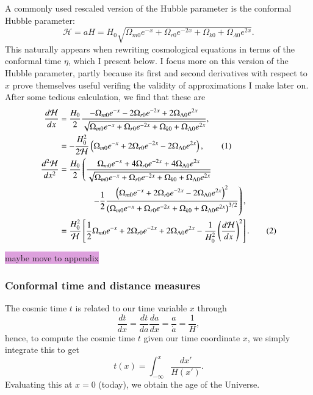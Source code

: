 \documentclass{aa}
\newcommand\numberthis{\addtocounter{equation}{1}\tag{\theequation}}
\begin{document}
A commonly used rescaled version of the Hubble parameter is the conformal Hubble parameter:
\begin{equation}
    \mathcal{H} = aH = H_0 \sqrt{\Omega_{m0} e^{-x} + \Omega_{r0} e^{-2x} + \Omega_{k0} + \Omega_{\Lambda 0}e^{2x}}. \label{eq:Hp}
\end{equation}
This naturally appears when rewriting cosmological equations in terms of the conformal time $\eta$, which I present below. I focus more on this version of the Hubble parameter, partly because its first and second derivatives with respect to $x$ prove themselves useful verifing the validity of approximations I make later on. After some tedious calculation, we find that these are
\begin{align*}
    \frac{d\mathcal{H}}{dx} &= \frac{H_0}{2}
    \frac{-\Omega_{m0}e^{-x} - 2\Omega_{r0}e^{-2x} + 2\Omega_{\Lambda0}e^{2x}}
    {\sqrt{\Omega_{m0}e^{-x} 
    + \Omega_{r0}e^{-2x}
    + \Omega_{k0} + \Omega_{\Lambda0}e^{2x}}},
    \\
    &= -\frac{H_0^2}{2\mathcal{H}}\left(\Omega_{m0}e^{-x} + 2\Omega_{r0}e^{-2x} - 2\Omega_{\Lambda0}e^{2x}\right), \numberthis \label{eq:dHpdx}
    \\
    \frac{d^2\mathcal{H}}{dx^2} &= \frac{H_0}{2}
    \left(\frac{\Omega_{m0}e^{-x} + 4\Omega_{r0}e^{-2x} + 4\Omega_{\Lambda0}e^{2x}}{\sqrt{\Omega_{m0}e^{-x} + \Omega_{r0}e^{-2x} + \Omega_{k0} + \Omega_{\Lambda0}e^{2x}}}\right.
    \\
    &\hspace{38pt}
    \left.- \frac{1}{2}\frac{\left(\Omega_{m0}e^{-x} + 2\Omega_{r0}e^{-2x} - 2\Omega_{\Lambda0}e^{2x}\right)^2}{\left(\Omega_{m0}e^{-x} + \Omega_{r0}e^{-2x} + \Omega_{k0} + \Omega_{\Lambda0}e^{2x}\right)^{3/2}}\right),
    \\
    &= \frac{H_0^2}{\mathcal{H}}\left[\frac{1}{2}\Omega_{m0}e^{-x} + 2\Omega_{r0}e^{-2x} + 2\Omega_{\Lambda0}e^{2x}- \frac{1}{H_0^2}\left(\frac{d\mathcal{H}}{dx}\right)^2\right]. \numberthis \label{eq:ddHpddx}
\end{align*}

\colorbox{Plum}{maybe move to appendix}


\subsubsection{Conformal time and distance measures}
The cosmic time $t$ is related to our time variable $x$ through
\begin{equation}
  \frac{dt}{dx} = \frac{dt}{da}\frac{da}{dx} = \frac{a}{\dot{a}} = \frac{1}{H},
\end{equation}
hence, to compute the cosmic time $t$ given our time coordinate $x$, we simply integrate this to get 
\begin{equation}
  t(x) = \int_{-\infty}^{x} \frac{dx'}{H(x')}.
\end{equation}
Evaluating this at $x=0$ (today), we obtain the age of the Universe.
\end{document}
